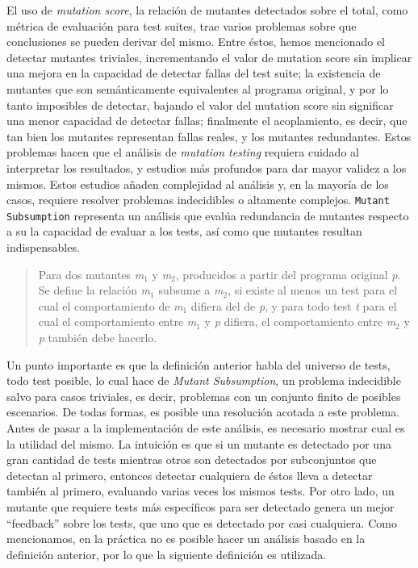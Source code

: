 El uso de \emph{mutation score}, la relaci\'on de mutantes detectados sobre el total, como m\'etrica de evaluaci\'on para test suites, trae varios problemas sobre que conclusiones se pueden derivar del mismo. Entre \'estos, hemos mencionado el detectar mutantes triviales, incrementando el valor de mutation score sin implicar una mejora en la capacidad de detectar fallas del test suite; la existencia de mutantes que son sem\'anticamente equivalentes al programa original, y por lo tanto imposibles de detectar, bajando el valor del mutation score sin significar una menor capacidad de detectar fallas; finalmente el acoplamiento, es decir, que tan bien los mutantes representan fallas reales, y los mutantes redundantes. Estos problemas hacen que el an\'alisis de \emph{mutation testing} requiera cuidado al interpretar los resultados, y estudios m\'as profundos para dar mayor validez a los mismos. Estos estudios a\~naden complejidad al an\'alisis y, en la mayor\'ia de los casos, requiere resolver problemas indecidibles o altamente complejos. \texttt{Mutant Subsumption} representa un an\'alisis que eval\'ua redundancia de mutantes respecto a su la capacidad de evaluar a los tests, as\'i como que mutantes resultan indispensables.
\begin{quote}
	Para dos mutantes \emph{m$_1$} y \emph{m$_2$}, producidos a partir del programa original \emph{p}. Se define la relaci\'on \emph{m$_1$} subsume a \emph{m$_2$}, si existe al menos un test para el cual el comportamiento de \emph{m$_1$} difiera del de \emph{p}, y para todo test \emph{t} para el cual el comportamiento entre \emph{m$_1$} y \emph{p} difiera, el comportamiento entre \emph{m$_2$} y \emph{p} tambi\'en debe hacerlo.
\end{quote}
Un punto importante es que la definici\'on anterior habla del universo de tests, todo test posible, lo cual hace de \emph{Mutant Subsumption}, un problema indecidible salvo para casos triviales, es decir, problemas con un conjunto finito de posibles escenarios. De todas formas, es posible una resoluci\'on acotada a este problema. Antes de pasar a la implementaci\'on de este an\'alisis, es necesario mostrar cual es la utilidad del mismo.
La intuici\'on es que si un mutante es detectado por una gran cantidad de tests mientras otros son detectados por subconjuntos que detectan al primero, entonces detectar cualquiera de \'estos lleva a detectar tambi\'en al primero, evaluando varias veces los mismos tests. Por otro lado, un mutante que requiere tests m\'as espec\'ificos para ser detectado genera un mejor ``feedback'' sobre los tests, que uno que es detectado por casi cualquiera. Como mencionamos, en la pr\'actica no es posible hacer un an\'alisis basado en la definici\'on anterior, por lo que la siguiente definici\'on es utilizada.
